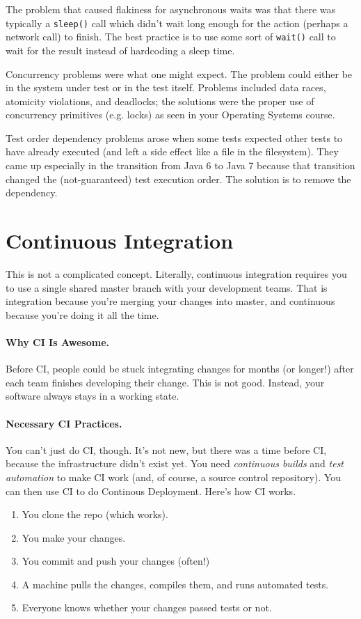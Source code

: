 \documentclass[11pt]{article}
\begin{document}
The problem that caused flakiness for asynchronous waits was that there was typically a
{\tt sleep()} call which didn't wait long enough for the action (perhaps a network call)
to finish. The best practice is to use some sort of {\tt wait()} call to wait for the result
instead of hardcoding a sleep time.

Concurrency problems were what one might expect. The problem could either be in the system under
test or in the test itself. Problems included data races, atomicity violations, and deadlocks;
the solutions were the proper use of concurrency primitives (e.g. locks) as seen in your 
Operating Systems course.

Test order dependency problems arose when some tests expected other tests to have already
executed (and left a side effect like a file in the filesystem). They came up especially 
in the transition from Java 6 to Java 7 because that transition changed the (not-guaranteed)
test execution order. The solution is to remove the dependency.

\section*{Continuous Integration}
This is not a complicated concept. Literally, continuous integration requires you to use
a single shared master branch with your development teams. That is integration because you're
merging your changes into master, and continuous because you're doing it all the time.

\paragraph{Why CI Is Awesome.} Before CI, people could be stuck integrating changes for months 
(or longer!) after each team finishes developing their change. This is not good. Instead,
your software always stays in a working state.

\paragraph{Necessary CI Practices.} You can't just do CI, though. It's not new, but there
was a time before CI, because the infrastructure didn't exist yet. You need \emph{continuous builds} and \emph{test automation} to make CI work (and, of course, a source control repository).
You can then use CI to do Continous Deployment. Here's how CI works.

    \begin{enumerate}[noitemsep]
    \item You clone the repo (which works).
    \item You make your changes.
    \item You commit and push your changes (often!)
    \item A machine pulls the changes, compiles them, and runs automated tests.
      \item Everyone knows whether your changes passed tests or not.
    \end{enumerate}
\end{document}
